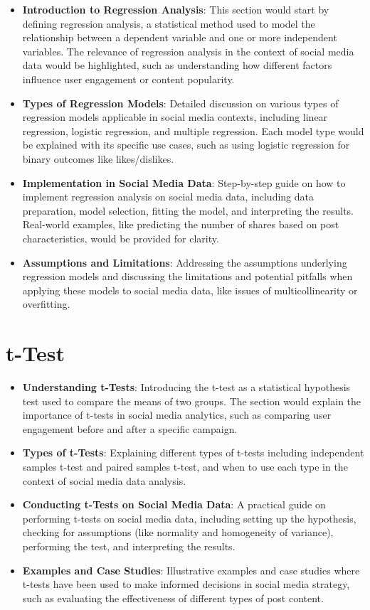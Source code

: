 \documentclass[
]{book}
\providecommand{\tightlist}{%
  \setlength{\itemsep}{0pt}\setlength{\parskip}{0pt}}
\begin{document}
\begin{itemize}
\tightlist
\item
  \textbf{Introduction to Regression Analysis}: This section would start by defining regression analysis, a statistical method used to model the relationship between a dependent variable and one or more independent variables. The relevance of regression analysis in the context of social media data would be highlighted, such as understanding how different factors influence user engagement or content popularity.
\item
  \textbf{Types of Regression Models}: Detailed discussion on various types of regression models applicable in social media contexts, including linear regression, logistic regression, and multiple regression. Each model type would be explained with its specific use cases, such as using logistic regression for binary outcomes like likes/dislikes.
\item
  \textbf{Implementation in Social Media Data}: Step-by-step guide on how to implement regression analysis on social media data, including data preparation, model selection, fitting the model, and interpreting the results. Real-world examples, like predicting the number of shares based on post characteristics, would be provided for clarity.
\item
  \textbf{Assumptions and Limitations}: Addressing the assumptions underlying regression models and discussing the limitations and potential pitfalls when applying these models to social media data, like issues of multicollinearity or overfitting.
\end{itemize}

\hypertarget{t-test}{%
\section*{t-Test}\label{t-test}}

\begin{itemize}
\tightlist
\item
  \textbf{Understanding t-Tests}: Introducing the t-test as a statistical hypothesis test used to compare the means of two groups. The section would explain the importance of t-tests in social media analytics, such as comparing user engagement before and after a specific campaign.
\item
  \textbf{Types of t-Tests}: Explaining different types of t-tests including independent samples t-test and paired samples t-test, and when to use each type in the context of social media data analysis.
\item
  \textbf{Conducting t-Tests on Social Media Data}: A practical guide on performing t-tests on social media data, including setting up the hypothesis, checking for assumptions (like normality and homogeneity of variance), performing the test, and interpreting the results.
\item
  \textbf{Examples and Case Studies}: Illustrative examples and case studies where t-tests have been used to make informed decisions in social media strategy, such as evaluating the effectiveness of different types of post content.
\end{itemize}
\end{document}
